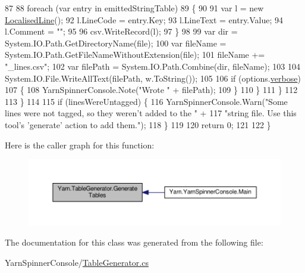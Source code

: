 \begin{DoxyCode}
87 
88                         \textcolor{keywordflow}{foreach} (var entry \textcolor{keywordflow}{in} emittedStringTable)
89                         \{
90 
91                             var l = \textcolor{keyword}{new} \hyperlink{a00128}{LocalisedLine}();
92                             l.LineCode = entry.Key;
93                             l.LineText = entry.Value;
94                             l.Comment = \textcolor{stringliteral}{""};
95 
96                             csv.WriteRecord(l);
97                         \}
98 
99                         var dir = System.IO.Path.GetDirectoryName(file);
100                         var fileName = System.IO.Path.GetFileNameWithoutExtension(file);
101                         fileName += \textcolor{stringliteral}{"\_lines.csv"};
102                         var filePath = System.IO.Path.Combine(dir, fileName);
103 
104                         System.IO.File.WriteAllText(filePath, w.ToString());
105 
106                         \textcolor{keywordflow}{if} (options.\hyperlink{a00035_ada4d83d1756918f362d55f6649b82b17}{verbose})
107                         \{
108                             YarnSpinnerConsole.Note(\textcolor{stringliteral}{"Wrote "} + filePath);
109                         \}
110                     \}
111                 \}
112 
113             \}
114 
115             \textcolor{keywordflow}{if} (linesWereUntagged) \{
116                 YarnSpinnerConsole.Warn(\textcolor{stringliteral}{"Some lines were not tagged, so they weren't added to the "} +
117                                \textcolor{stringliteral}{"string file. Use this tool's 'generate' action to add them."});
118             \}
119 
120             \textcolor{keywordflow}{return} 0;
121 
122         \}
\end{DoxyCode}


Here is the caller graph for this function\-:
\nopagebreak
\begin{figure}[H]
\begin{center}
\leavevmode
\includegraphics[width=350pt]{a00163_a1d65ef643c3f3495cf9480f86172ff87_icgraph}
\end{center}
\end{figure}




The documentation for this class was generated from the following file\-:\begin{DoxyCompactItemize}
\item 
Yarn\-Spinner\-Console/\hyperlink{a00315}{Table\-Generator.\-cs}\end{DoxyCompactItemize}
